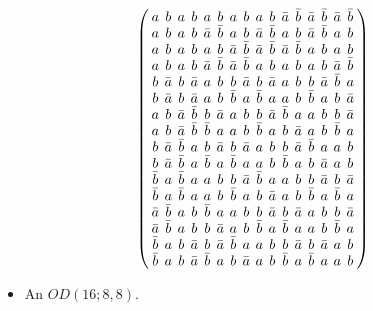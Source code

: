 \documentclass{beamer}
\begin{document}
\begin{frame}

  \[
    \arraycolsep=2.0pt\def\arraystretch{0.75}
    \left(
      \begin{array}{cccccccccccccccc}
        a&b&a&b&a&b&a&b&a&b&\bar{a}&\bar{b}&\bar{a}&\bar{b}&\bar{a}&\bar{b}\\
        a&b&a&b&\bar{a}&\bar{b}&a&b&\bar{a}&\bar{b}&a&b&\bar{a}&\bar{b}&a&b\\
        a&b&a&b&a&b&\bar{a}&\bar{b}&\bar{a}&\bar{b}&\bar{a}&\bar{b}&a&b&a&b\\
        a&b&a&b&\bar{a}&\bar{b}&\bar{a}&\bar{b}&a&b&a&b&a&b&\bar{a}&\bar{b}\\
        b&\bar{a}&b&\bar{a}&a&b&b&\bar{a}&b&\bar{a}&a&b&b&\bar{a}&\bar{b}&a\\
        b&\bar{a}&b&\bar{a}&a&b&\bar{b}&a&\bar{b}&a&a&b&\bar{b}&a&b&\bar{a}\\
        a&b&\bar{a}&\bar{b}&b&\bar{a}&a&b&b&\bar{a}&\bar{b}&a&a&b&b&\bar{a}\\
        a&b&\bar{a}&\bar{b}&\bar{b}&a&a&b&\bar{b}&a&b&\bar{a}&a&b&\bar{b}&a\\
        b&\bar{a}&\bar{b}&a&b&\bar{a}&b&\bar{a}&a&b&b&\bar{a}&\bar{b}&a&a&b\\
        b&\bar{a}&\bar{b}&a&\bar{b}&a&\bar{b}&a&a&b&\bar{b}&a&b&\bar{a}&a&b\\
        \bar{b}&a&\bar{b}&a&a&b&b&\bar{a}&\bar{b}&a&a&b&b&\bar{a}&b&\bar{a}\\
        \bar{b}&a&\bar{b}&a&a&b&\bar{b}&a&b&\bar{a}&a&b&\bar{b}&a&\bar{b}&a\\
        \bar{a}&\bar{b}&a&b&\bar{b}&a&a&b&b&\bar{a}&b&\bar{a}&a&b&b&\bar{a}\\
        \bar{a}&\bar{b}&a&b&b&\bar{a}&a&b&\bar{b}&a&\bar{b}&a&a&b&\bar{b}&a\\
        \bar{b}&a&b&\bar{a}&b&\bar{a}&\bar{b}&a&a&b&b&\bar{a}&b&\bar{a}&a&b\\
        \bar{b}&a&b&\bar{a}&\bar{b}&a&b&\bar{a}&a&b&\bar{b}&a&\bar{b}&a&a&b\\
      \end{array}
    \right)
  \]

  \begin{itemize}
    \item An $OD(16;8,8)$.
  \end{itemize}
  
\end{frame}
\end{document}
